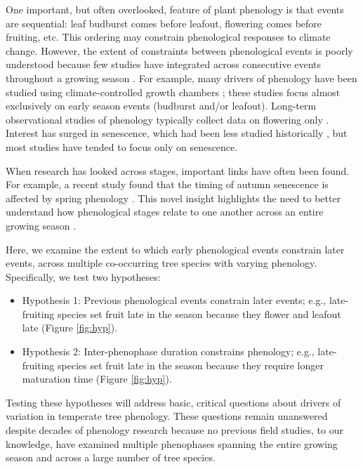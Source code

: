 \documentclass{article}
\begin{document}
\par One important, but often overlooked, feature of plant phenology is that events are sequential: leaf budburst comes before leafout, flowering comes before fruiting, etc. This ordering may constrain phenological responses to climate change. However, the extent of constraints between phenological events is poorly understood because few studies have integrated across consecutive events throughout a growing season \citep{wolkovich2014}. For example, many drivers of phenology have been studied using climate-controlled growth chambers \citep[e.g.,][]{basler2012, laube2014}; these studies focus almost exclusively on early season events (budburst and/or leafout).  Long-term observational studies of phenology typically collect data on flowering only  \citep [e.g. 64\% of studies in ][]{wolkovich2012nectar}. Interest has surged in senescence, which had been less studied historically \citep {parmesan2006}, but most studies have tended to focus only on senescence. %

\par When research has looked across stages, important links have often been found. For example, a recent study found that the timing of autumn senescence is affected by spring phenology \citep {keenan2015}. This novel insight highlights the need to better understand how phenological stages relate to one another across an entire growing season \citep{wolkovich2014}. %

\par Here, we examine the extent to which early phenological events constrain later events, across multiple co-occurring tree species with varying phenology. Specifically, we test two hypotheses:
\begin{itemize}
\item Hypothesis 1: Previous phenological events constrain later events; e.g., late-fruiting species set fruit late in the season because they flower and leafout late  (Figure \ref{fig:hyp}).
\item Hypothesis 2: Inter-phenophase duration constrains phenology; e.g., late-fruiting species set fruit late in the season because they require longer maturation time (Figure \ref{fig:hyp}).
\end{itemize}
Testing these hypotheses will address basic, critical questions about drivers of variation in temperate tree phenology. These questions remain unanswered despite decades of phenology research because no previous field studies, to our knowledge, have examined multiple phenophases spanning the entire growing season and across a large number of tree species. 
\end{document}
